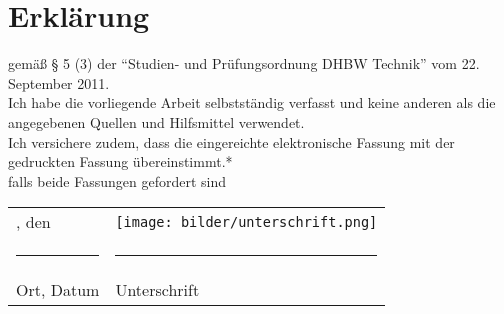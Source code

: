 \section*{Erklärung}

gemäß § 5 (3) der \enquote{Studien- und Prüfungsordnung DHBW Technik} vom 22. September 2011.\vspace*{\baselineskip}\\
Ich habe die vorliegende Arbeit selbstständig verfasst und keine anderen als die angegebenen Quellen und Hilfsmittel verwendet.\vspace*{\baselineskip}\\
Ich versichere zudem, dass die eingereichte elektronische Fassung mit der gedruckten Fassung übereinstimmt.*\vspace*{\baselineskip}\\
{\footnotesize * falls beide Fassungen gefordert sind}\\
\begin{tabularx}{\textwidth}{ll}
	\ort, den \abgabedatum{} & \texttt{[image: bilder/unterschrift.png]} \\
	\rule{7cm}{1pt} & \rule{5cm}{1pt}\\
	Ort, Datum & Unterschrift
\end{tabularx}
